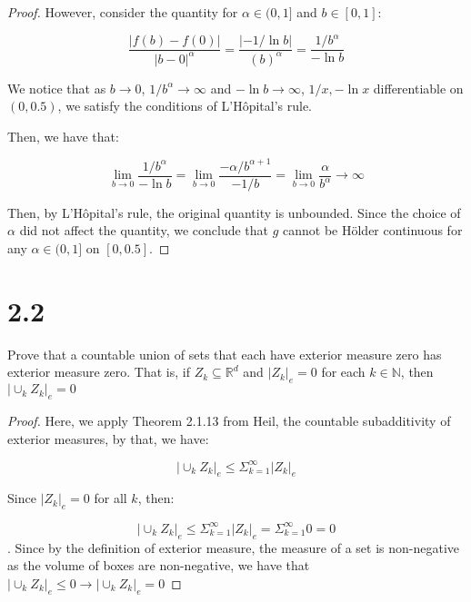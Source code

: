 \documentclass[10pt]{article}
\newenvironment{problem}[2][Problem]{\begin{trivlist}
\item[\hskip \labelsep {\bfseries #1}\hskip \labelsep {\bfseries #2.}]}{\end{trivlist}}
\begin{document}
\begin{proof}[Proof]
However, consider the quantity for $\alpha \in (0,1]$ and $b \in [0,1]$:

$$ \frac{|f(b) - f(0)|}{|b-0|^{\alpha}} = \frac{|-1/\ln b|}{(b)^{\alpha}} =  \frac{1/b^{\alpha}}{-\ln b}$$

We notice that as $b \rightarrow 0$, $1/b^{\alpha} \rightarrow \infty$ and $-\ln b \rightarrow \infty$, $1/x, -\ln x$ differentiable on $(0,0.5)$, we satisfy the conditions of L'H\^{o}pital's rule.

Then, we have that:

$$ \lim_{b \rightarrow 0} \frac{1/b^{\alpha}}{-\ln b} =  \lim_{b \rightarrow 0} \frac{-\alpha/b^{\alpha + 1}}{-1/b} = \lim_{b \rightarrow 0} \frac{\alpha}{b^{\alpha}} \rightarrow \infty $$

Then, by  L'H\^{o}pital's rule, the original quantity is unbounded. Since the choice of $\alpha$ did not affect the quantity, we conclude that $g$ cannot be  H\"{o}lder continuous for any $\alpha \in (0,1]$ on $[0,0.5]$.







\end{proof}

\section*{2.2}

\begin{problem}{2.1.29}
Prove that a countable union of sets that each have exterior measure zero has exterior measure zero. That is, if $Z_k \subseteq \mathbb{R}^d$ and $|Z_k|_e = 0$ for each $k \in \mathbb{N}$, then $|\cup_k Z_k|_e = 0$
\end{problem}

\begin{proof}[Proof]
Here, we apply Theorem 2.1.13 from Heil, the countable subadditivity of exterior measures, by that, we have:

$$ |\cup_k Z_k|_e \leq \Sigma_{k=1}^{\infty} |Z_k|_e$$

Since $|Z_k|_e = 0$ for all $k$, then:

$$ |\cup_k Z_k|_e \leq \Sigma_{k=1}^{\infty} |Z_k|_e = \Sigma_{k=1}^{\infty} 0 = 0 $$. Since by the definition of exterior measure, the measure of a set is non-negative as the volume of boxes are non-negative, we have that $|\cup_k Z_k|_e \leq 0 \rightarrow |\cup_k Z_k|_e = 0$
\end{proof}
\end{document}
